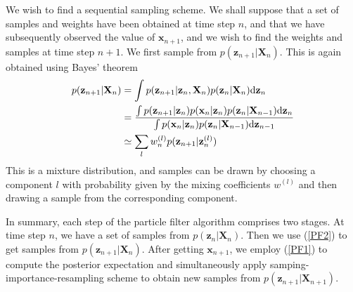 \documentclass[a4paper]{book}
\newcommand{\ud}{\mathrm{d}}
\renewcommand{\bf}{\mathbf}
\begin{document}
We wish to find a sequential sampling scheme. We shall suppose that a set of samples and weights have been obtained at time step $n$, and that we have subsequently observed the value of $\bf{x}_{n+1}$, and we wish to find the weights and samples at time step $n+1$. We first sample from $p(\bf{z}_{n+1}|\bf{X}_n)$. This is again obtained using Bayes' theorem
\begin{align}
	p(\bf{z}_{n+1}|\bf{X}_n) &= \int p(\bf{z}_{n+1}|\bf{z}_n,\bf{X}_n)p(\bf{z}_n|\bf{X}_n)\ud \bf{z}_n \notag\\
	&=\frac{\int p(\bf{z}_{n+1}|\bf{z}_n)p(\bf{x}_n|\bf{z}_n)p(\bf{z}_n|\bf{X}_{n-1})\ud \bf{z}_n}{\int p(\bf{x}_n|\bf{z}_n)p(\bf{z}_n|\bf{X}_{n-1})\ud \bf{z}_{n-1}}\notag\\
	&\simeq \sum_l w_n^{(l)} p(\bf{z}_{n+1}|\bf{z}_n^{(l)}) \label{PF2}
\end{align}
This is a mixture distribution, and samples can be drawn by choosing a component $l$ with probability given by the mixing coefficients $w^{(l)}$ and then drawing a sample from the corresponding component.

In summary, each step of the particle filter algorithm comprises two stages. At time step $n$, we have a set of samples from $p(\bf{z}_n|\bf{X}_n)$. Then we use (\ref{PF2}) to get samples from $p(\bf{z}_{n+1}|\bf{X}_n)$. After getting $\bf{x}_{n+1}$, we employ (\ref{PF1}) to compute the posterior expectation and simultaneously apply samping-importance-resampling scheme to obtain new samples from $p(\bf{z}_{n+1}|\bf{X}_{n+1})$.



\end{document}
